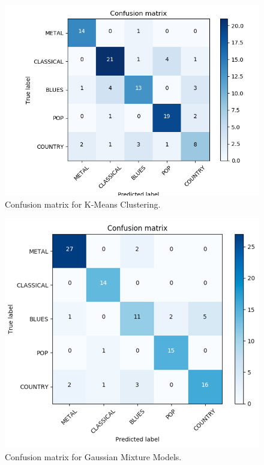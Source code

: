 \begin{figure}
\begin{center}
\includegraphics[scale=0.25]{./figures/confusion_kmeans.png}
\end{center}
\caption
{
Confusion matrix for K-Means Clustering. 
}
\label{fig:big_picture5}
\end{figure}

\begin{figure}
\begin{center}
\includegraphics[scale=0.3]{./figures/confusion_gmm.png}
\end{center}
\caption
{
Confusion matrix for Gaussian Mixture Models. 
}
\label{fig:big_picture5}
\end{figure}

